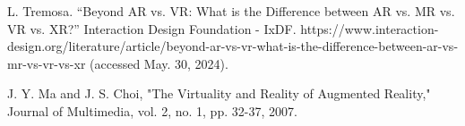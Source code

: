 \documentclass[conference]{IEEEtran}
\begin{document}
\begin{thebibliography}{00}
  L. Tremosa. “Beyond AR vs. VR: What is the Difference between AR vs. MR vs. VR vs. XR?” Interaction Design Foundation - IxDF. https://www.interaction-design.org/literature/article/beyond-ar-vs-vr-what-is-the-difference-between-ar-vs-mr-vs-vr-vs-xr (accessed May. 30, 2024).

  J. Y. Ma and J. S. Choi, "The Virtuality and Reality of Augmented Reality," Journal of Multimedia, vol. 2, no. 1, pp. 32-37, 2007.
\end{thebibliography}
\end{document}
